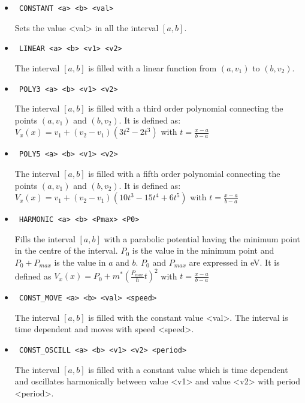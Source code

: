 \documentclass[a4paper,11pt]{article}
\begin{document}
\begin{itemize}
\begin{itemize}
  \item \begin{verbatim} CONSTANT <a> <b> <val> \end{verbatim}
    Sets the value <val> in all the interval $[a, b]$.
  \item \begin{verbatim} LINEAR <a> <b> <v1> <v2> \end{verbatim}
    The interval $[a, b]$ is filled with a linear function from $(a, v_1)$ to $(b, v_2)$.
  \item \begin{verbatim} POLY3 <a> <b> <v1> <v2> \end{verbatim}
    The interval $[a, b]$ is filled with a third order polynomial connecting
    the points $(a, v_1)$ and $(b, v_2)$. It is defined as:
    $ V_x(x) = v_1 + (v_2-v_1)( 3t^2 - 2t^3 ) $ with $t = \frac{x-a}{b-a} $
  \item \begin{verbatim} POLY5 <a> <b> <v1> <v2> \end{verbatim}
    The interval $[a, b]$ is filled with a fifth order polynomial connecting
    the points $(a, v_1)$ and $(b, v_2)$. It is defined as:
    $ V_x(x) = v_1 + (v_2-v_1)( 10t^3 - 15t^4 + 6t^5) $ with $t = \frac{x-a}{b-a} $
  \item \begin{verbatim} HARMONIC <a> <b> <Pmax> <P0> \end{verbatim}
    Fills the interval $[a, b]$ with a parabolic potential having the minimum point in the centre of the interval. $P_0$ is the value in the minimum point and $P_0 + P_{max}$ is the value in $a$ and $b$.
    $P_0$ and $P_{max}$ are expressed in eV. It is defined as
    $ V_x(x) = P_0 + m^* \left(\frac{P_{max}}{\hbar} t \right)^2 $ with $t = \frac{x-a}{b-a} $
  \item \begin{verbatim} CONST_MOVE <a> <b> <val> <speed> \end{verbatim}
    The interval $[a, b]$ is filled with the constant value <val>. The interval is time dependent and moves with speed <speed>.
  \item \begin{verbatim} CONST_OSCILL <a> <b> <v1> <v2> <period> \end{verbatim}
    The interval $[a, b]$ is filled with a constant value which is time dependent and oscillates harmonically between value <v1> and value <v2> with period <period>.

\end{itemize}
\end{itemize}
\end{document}
